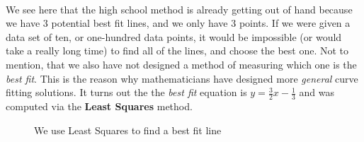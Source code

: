 \documentclass[12pt, letterpaper]{article}
\begin{document}
			\paragraph{}	
				We see here that the high school method is already getting out of hand because we have 3 potential best fit lines, and we only have 3 points. If we were given a data set of ten, or one-hundred data points, it would be impossible (or would take a really long time) to find all of the lines, and choose the best one. Not to mention, that we also have not designed a method of measuring which one is the \textit{best fit}. This is the reason why mathematicians have designed more \textit{general} curve fitting solutions. It turns out the the \textit{best fit} equation is $y=\frac{3}{2}x-\frac{1}{3}$ and was computed via the \textbf{Least Squares} method.
			
			\begin{figure}[H]	
				\begin{center}
				\end{center}
				\caption{We use Least Squares to find a best fit line}
			\end{figure}
			
\end{document}
